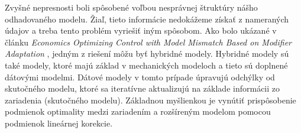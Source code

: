 Zvyšné nepresnosti boli spôsobené voľbou nesprávnej štruktúry nášho odhadovaného modelu. Žiaľ, tieto informácie nedokážeme získať z nameraných údajov a treba tento problém vyriešiť iným spôsobom. Ako bolo ukázané v článku \textit{Economics Optimizing Control with Model Mismatch Based on Modifier Adaptation} \cite{HERNANDEZ201946}, jedným z riešení môžu byť hybridné modely. Hybridné modely sú také modely, ktoré majú základ v mechanických modeloch a tieto sú doplnené dátovými modelmi. Dátové modely v tomto prípade úpravujú odchýlky od skutočného modelu, ktoré sa iteratívne aktualizujú na základe informácii zo zariadenia (skutočného modelu). Základnou myšlienkou je vynútiť prispôsobenie podmienok optimality medzi zariadením a rozšíreným modelom pomocou podmienok lineárnej korekcie.